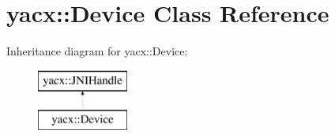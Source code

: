 \hypertarget{classyacx_1_1_device}{}\section{yacx\+:\+:Device Class Reference}
\label{classyacx_1_1_device}
Inheritance diagram for yacx\+:\+:Device\+:\begin{figure}[H]
\begin{center}
\leavevmode
\includegraphics[height=2.000000cm]{classyacx_1_1_device}
\end{center}
\end{figure}
